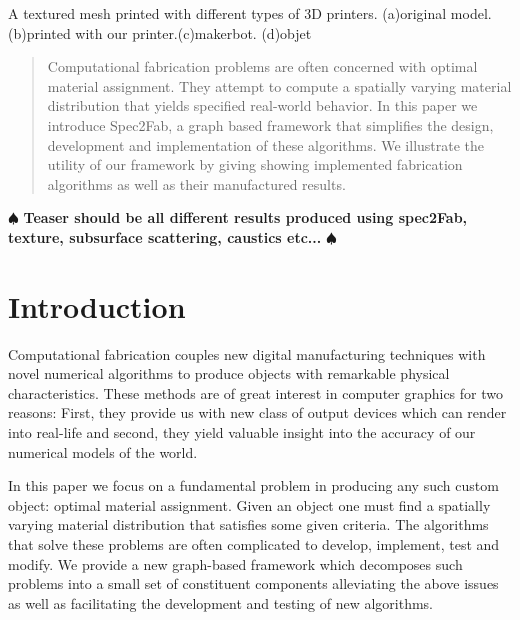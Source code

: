\documentclass[annual]{acmsiggraph}
\newcommand{\note}[1]{\marginpar{\LARGE $\spadesuit$}
			$\spadesuit$ {\bf #1} $\spadesuit$}
\begin{document}
{\begin{subfigure}[b]{0.18\textwidth}
                \caption{}
                \label{teaser:objet}
        \end{subfigure}
        \caption{A textured mesh printed with different types of 3D printers.
        	(a)original model.(b)printed with our printer.(c)makerbot.
        	(d)objet}\label{teaser}
	\label{fig:texture}
 }

\maketitle

\begin{abstract}
Computational fabrication problems are often concerned with optimal material assignment. They attempt to compute a spatially varying material distribution that yields specified real-world behavior. In this paper we introduce Spec2Fab, a graph based framework that simplifies the design, development and implementation of these algorithms. We illustrate the utility of our framework by giving showing implemented fabrication algorithms as well as their manufactured results. 
\end{abstract}

\keywordlist

\TOGlinkslist

\copyrightspace

\note{Teaser should be all different results produced using spec2Fab, texture, subsurface scattering, caustics etc...}


\section{Introduction}
Computational fabrication couples new digital manufacturing techniques with novel numerical algorithms to produce objects with remarkable physical characteristics. These methods are of great interest in computer graphics for two reasons: First, they provide us with  new class of output devices which can render into  real-life and second, they yield valuable insight into the accuracy of our numerical models of the world.  

In this paper we focus on a fundamental problem in producing any such custom object:  optimal material assignment. Given an object one must find a spatially varying material distribution that satisfies some given criteria. The algorithms that solve these problems are often complicated to develop, implement, test and modify. We provide a new graph-based framework which decomposes such problems into a small set of constituent components alleviating the above issues as well as facilitating the development and testing of new algorithms. 
\end{document}
